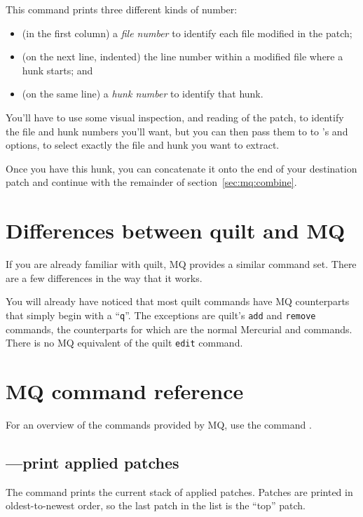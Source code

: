This command prints three different kinds of number:
\begin{itemize}
\item (in the first column) a \emph{file number} to identify each file
  modified in the patch;
\item (on the next line, indented) the line number within a modified
  file where a hunk starts; and
\item (on the same line) a \emph{hunk number} to identify that hunk.
\end{itemize}

You'll have to use some visual inspection, and reading of the patch,
to identify the file and hunk numbers you'll want, but you can then
pass them to to 's 
and  options, to select exactly the file
and hunk you want to extract.

Once you have this hunk, you can concatenate it onto the end of your
destination patch and continue with the remainder of
section~\ref{sec:mq:combine}.

\section{Differences between quilt and MQ}

If you are already familiar with quilt, MQ provides a similar command
set.  There are a few differences in the way that it works.

You will already have noticed that most quilt commands have MQ
counterparts that simply begin with a ``\texttt{q}''.  The exceptions
are quilt's \texttt{add} and \texttt{remove} commands, the
counterparts for which are the normal Mercurial  and
 commands.  There is no MQ equivalent of the quilt
\texttt{edit} command.
\section{MQ command reference}
\label{sec:mq:cmdref}

For an overview of the commands provided by MQ, use the command
.

\subsection{---print applied patches}

The  command prints the current stack of applied
patches.  Patches are printed in oldest-to-newest order, so the last
patch in the list is the ``top'' patch.

